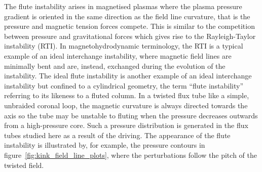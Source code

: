 \documentclass[fleqn,usenatbib]{mnras}
\newcommand{\rs}[2]{{#2}}
\begin{document}
The \rs{fluting}{flute} instability arises in magnetised plasmas where
the plasma pressure gradient is \rs{directed}{oriented} in the same direction as the
field line curvature, that is the pressure and magnetic tension forces
compete. This is similar to the competition between pressure and
gravitational forces which gives rise to the Rayleigh-Taylor
instability (RTI). In \rs{MHD}{magnetohydrodynamic terminology}, the RTI is a typical example of an ideal
interchange instability, where magnetic field lines are minimally bent
and are, instead, exchanged during the evolution of the
instability. The ideal \rs{fluting}{flute} instability is another example of an
ideal interchange instability but confined to a cylindrical geometry,
the term \rs{``fluting instability''}{``flute instability''} referring to its likeness to a fluted
column. In a twisted flux tube like a simple, unbraided coronal loop,
the magnetic curvature is always directed towards the axis so the tube
may be unstable to fluting when the pressure decreases outwards from a
high-pressure core. Such a pressure distribution is generated in the
flux tubes studied here as a result of the driving. The appearance of
the \rs{fluting}{flute} instability is illustrated by, for example, the pressure
contours in figure~\ref{fig:kink_field_line_plots}, where the
perturbations follow the pitch of the twisted field. 
\end{document}
